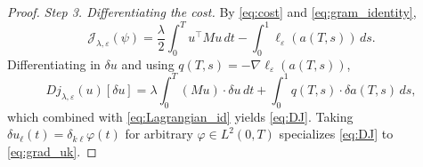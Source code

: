 \documentclass[10pt,a4paper]{amsart}
\begin{document}
\begin{proof}
\vskip 5pt
\noindent\textit{Step 3. Differentiating the cost.}
By \eqref{eq:cost} and \eqref{eq:gram_identity}, $$\mathcal J_{\lambda,\varepsilon}(\psi)=\frac\lambda2\int_0^T u^\top Mu\,dt-\int_0^1\ell_\varepsilon(a(T,s))\,ds.$$ Differentiating in $\delta u$ and using $q(T,s)=-\nabla\ell_\varepsilon(a(T,s))$,
\[
Dj_{\lambda,\varepsilon}(u)[\delta u]
=\lambda\!\int_0^T\!\!(Mu)\cdot\delta u\,dt+\int_0^1 q(T,s)\cdot\delta a(T,s)\,ds,
\]
which combined with \eqref{eq:Lagrangian_id} yields \eqref{eq:DJ}. Taking $\delta u_\ell(t)=\delta_{k\ell}\varphi(t)$ for arbitrary $\varphi\in L^2(0,T)$ specializes \eqref{eq:DJ} to \eqref{eq:grad_uk}.
\end{proof}
\end{document}
